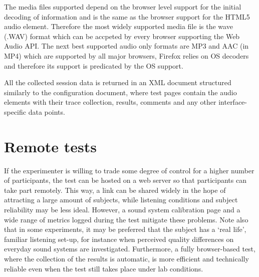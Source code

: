 \documentclass{sig-alternate}
\begin{document}
    The media files supported depend on the browser level support for the initial decoding of information and is the same as the browser support for the HTML5 audio element. Therefore the most widely supported media file is the wave (.WAV) format which can be accpeted by every browser supporting the Web Audio API. The next best supported audio only formats are MP3 and AAC (in MP4) which are supported by all major browsers, Firefox relies on OS decoders and therefore its support is predicated by the OS support.
    
    All the collected session data is returned in an XML document structured similarly to the configuration document, where test pages contain the audio elements with their trace collection, results, comments and any other interface-specific data points.
    
\section{Remote tests} %

	If the experimenter is willing to trade some degree of control for a higher number of participants, the test can be hosted on a web server so that participants can take part remotely. This way, a link can be shared widely in the hope of attracting a large amount of subjects, while listening conditions and subject reliability may be less ideal. However, a sound system calibration page and a wide range of metrics logged during the test mitigate these problems. Note also that in some experiments, it may be preferred that the subject has a `real life', familiar listening set-up, for instance when perceived quality differences on everyday sound systems are investigated. 
	Furthermore, a fully browser-based test, where the collection of the results is automatic, is more efficient and technically reliable even when the test still takes place under lab conditions.
\end{document}
